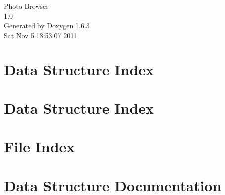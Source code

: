 \documentclass[a4paper]{book}
\begin{document}
\hypersetup{pageanchor=false}
\begin{titlepage}
\vspace*{7cm}
\begin{center}
{\Large Photo Browser \\[1ex]\large 1.0 }\\
\vspace*{1cm}
{\large Generated by Doxygen 1.6.3}\\
\vspace*{0.5cm}
{\small Sat Nov 5 18:53:07 2011}\\
\end{center}
\end{titlepage}
\clearemptydoublepage
{}
\tableofcontents
\clearemptydoublepage
{}
\hypersetup{pageanchor=true}
\chapter{Data Structure Index}

\chapter{Data Structure Index}

\chapter{File Index}

\chapter{Data Structure Documentation}





























\end{document}
